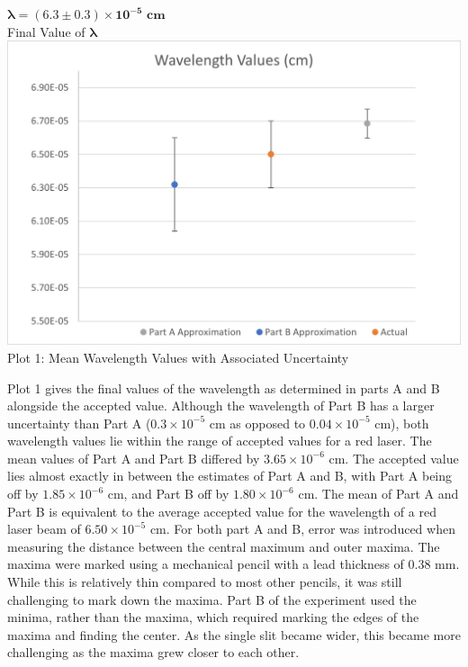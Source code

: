 \begin{center}
    $\boxed{\bm{\lambda=(6.3\pm 0.3)\times10^{-5}}\textbf{ cm}}$
    \vspace{3mm}
    \\Final Value of $\bm{\lambda}$\\
    \vspace{5mm}
    \includegraphics*[]{Wavelength Values.jpg}
    \\Plot 1: Mean Wavelength Values with Associated Uncertainty
\end{center}
Plot 1 gives the final values of the wavelength as determined in parts A and B alongside the accepted value. 
Although the wavelength of Part B has a larger uncertainty than Part A ($0.3\times10^{-5}$ cm as opposed to $0.04\times10^{-5}$ cm), both wavelength values lie within the range of accepted values for a red laser.
The mean values of Part A and Part B differed by $3.65\times10^{-6}$ cm. The accepted value lies almost exactly in between the estimates of Part A and B, with Part A being off by $1.85\times10^{-6}$ cm, and Part B off by $1.80\times10^{-6}$ cm.
The mean of Part A and Part B is equivalent to the average accepted value for the wavelength of a red laser beam of $6.50\times10^{-5}$ cm.
For both part A and B, error was introduced when measuring the distance between the central maximum and outer maxima. The maxima were marked using a mechanical pencil with a lead thickness of 0.38 mm. 
While this is relatively thin compared to most other pencils, it was still challenging to mark down the maxima. 
Part B of the experiment used the minima, rather than the maxima, which required marking the edges of the maxima and finding the center. 
As the single slit became wider, this became more challenging as the maxima grew closer to each other. 
